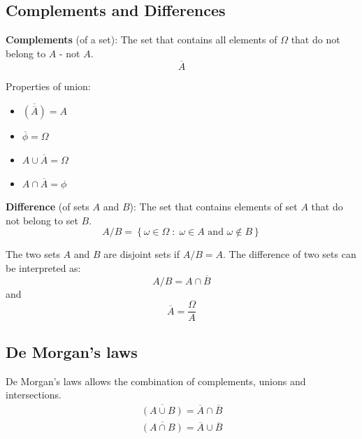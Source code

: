 \documentclass[10pt,a4paper]{article}
\begin{document}
\subsection{Complements and Differences}

\begin{tcolorbox}[breakable,colback=white]
\textbf{Complements} (of a set): The set that contains all elements of $\Omega$ that do not belong
to $A$ - not $A$.
$$
    \overline{A}
$$
\end{tcolorbox}

Properties of union:
\begin{itemize}
    \item $\overline{(\overline{A})}=A$
    \item $\overline{\phi}=\Omega$
    \item $A \cup \overline{A}=\Omega$
    \item $A \cap \overline{A}=\phi$
\end{itemize}

\begin{tcolorbox}[breakable,colback=white]
\textbf{Difference} (of sets $A$ and $B$): The set that contains elements of set $A$ that do not
belong to set $B$.
$$
    A/B = \left\{\omega\in \Omega\; :\; \omega\in A \text{ and }\omega \notin B\right\}
$$
\end{tcolorbox}

The two sets $A$ and $B$ are disjoint sets if $A/B=A$. The difference of two sets can be interpreted
as:
$$
    A/B = A \cap \overline{B}
$$
and
$$
    \overline{A} = \frac{\Omega}{A}
$$

\subsection{De Morgan's laws}

De Morgan's laws allows the combination of complements, unions and intersections.
\begin{align*}
    \overline{(A \cup B)} = \overline{A} \cap \overline{B} \\
    \overline{(A\cap B)} = \overline{A} \cup \overline{B}
\end{align*}

\end{document}
